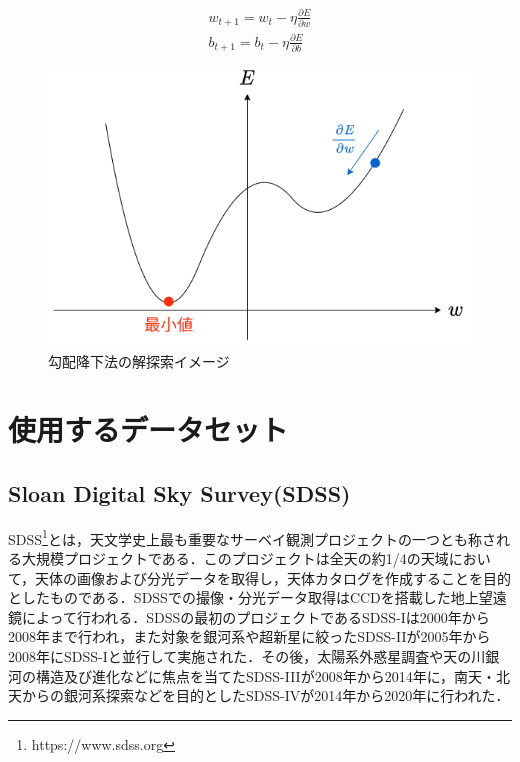 \documentclass[a4j, 11pt]{jreport}
\begin{document}
\begin{equation}
  \begin{array}{l}
    w_{t+1} = w_t - \eta \frac{\partial E}{\partial w} \\
    b_{t+1} = b_t - \eta \frac{\partial E}{\partial b}
  \end{array}
  \label{eq:gradient}
\end{equation}

\begin{figure}[H]
 \centering
 \includegraphics[width=0.7\hsize, keepaspectratio]{images/drawio/gradient.png}
 \caption{勾配降下法の解探索イメージ}
 \label{fig:gradient}
\end{figure}





\newpage
\chapter{使用するデータセット}
\section{Sloan Digital Sky Survey(SDSS)}

SDSS\footnote{https://www.sdss.org}とは，天文学史上最も重要なサーベイ観測プロジェクトの一つとも称される大規模プロジェクトである．このプロジェクトは全天の約1/4の天域において，天体の画像および分光データを取得し，天体カタログを作成することを目的としたものである．SDSSでの撮像・分光データ取得はCCDを搭載した地上望遠鏡によって行われる．SDSSの最初のプロジェクトであるSDSS-I\cite{York2000}は2000年から2008年まで行われ，また対象を銀河系や超新星に絞ったSDSS-II\cite{York2000}が2005年から2008年にSDSS-Iと並行して実施された．その後，太陽系外惑星調査や天の川銀河の構造及び進化などに焦点を当てたSDSS-III\cite{Eisenstein2011}が2008年から2014年に，南天・北天からの銀河系探索などを目的としたSDSS-IV\cite{Blanton2017}が2014年から2020年に行われた．
\end{document}

